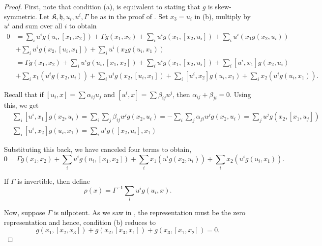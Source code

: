 \documentclass[12pt]{article}
\theoremstyle{thmstyle}
\theoremstyle{defstyle}
\newcommand{\frakh}{\mathfrak{h}}
\newcommand{\frakK}{\mathfrak{K}}
\begin{document}
\begin{proof}
    First, note that condition (a), is equivalent to stating that $g$ is skew-symmetric. Let $\frakK,\frakh,u_i,u^i,\Gamma$ be as in the proof of . Set $x_3 = u_i$ in (b), multiply by $u^i$ and sum over all $i$ to obtain 
    \begin{align*}
        0 &= \sum_{i} u^ig(u_i, [x_1, x_2]) + \Gamma g(x_1, x_2) + \sum_{i} u^ig(x_1, [x_2, u_i]) + \sum_{i} u^i\left(x_1g(x_2, u_i)\right)\\
        &+ \sum_{i} u^ig(x_2, [u_i, x_1]) + \sum_{i} u^i\left(x_2 g(u_i, x_1)\right)\\
        &= \Gamma g(x_1, x_2) + \sum_i u^ig(u_i, [x_1, x_2]) + \sum_i u^i g(x_1, [x_2, u_i]) + \sum_i [u^i, x_1]g(x_2, u_i)\\
        &+ \sum_i x_1\left(u^i g(x_2, u_i)\right) + \sum_i u^ig(x_2, [u_i,x_1]) + \sum_i [u^i, x_2]g(u_i, x_1) + \sum_i x_2\left(u^ig(u_i, x_1)\right).
    \end{align*}

    Recall that if $[u_i, x] = \sum \alpha_{ij} u_j$ and $[u^i, x] = \sum \beta_{ij} u^j$, then $\alpha_{ij} + \beta_{ji} = 0$. Using this, we get 
    \begin{align*}
        &\sum_i [u^i, x_1]g(x_2, u_i) = \sum_i\sum_j\beta_{ij} u^jg(x_2, u_i)  = -\sum_{i}\sum_{j} \alpha_{ji}u^jg(x_2, u_i) = \sum_{j} u^j g(x_2, [x_1, u_j])\\
        &\sum_i [u^i, x_2]g(u_i, x_1) = \sum_i u^i g([x_2, u_i], x_1)
    \end{align*}

    Substituting this back, we have canceled four terms to obtain,
    \begin{equation*}
        0 = \Gamma g(x_1, x_2) + \sum_i u^ig(u_i, [x_1, x_2]) + \sum_i x_1\left(u^ig(x_2, u_i)\right) + \sum_i x_2\left(u^ig(u_i, x_1)\right).
    \end{equation*}

    If $\Gamma$ is invertible, then define 
    \begin{equation*}
        \rho(x) = \Gamma^{-1}\sum_{i} u^ig(u_i, x).
    \end{equation*}

    Now, suppose $\Gamma$ is nilpotent. As we saw in , the representation must be the zero representation and hence, condition (b) reduces to
    \begin{equation*}
        g(x_1, [x_2,x_3]) + g(x_2, [x_3, x_1]) + g(x_3, [x_1, x_2]) = 0.
    \end{equation*}


\end{proof}
\end{document}
